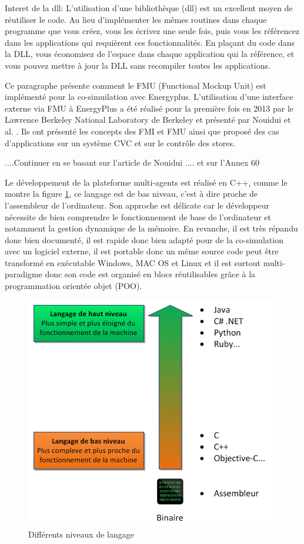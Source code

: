 Interet de la dll: L'utilisation d'une bibliothèque (dll) est un excellent moyen de réutiliser le code. Au lieu d'implémenter les mêmes routines dans chaque programme que vous créez, vous les écrivez une seule fois, puis vous les référencez dans les applications qui requièrent ces fonctionnalités. En plaçant du code dans la DLL, vous économisez de l'espace dans chaque application qui la référence, et vous pouvez mettre à jour la DLL sans recompiler toutes les applications.

Ce paragraphe présente comment le FMU (Functional Mockup Unit) est implémenté pour la co-simuilation avec Energyplus. L'utilisation d'une interface externe via FMU à EnergyPlus a été réalisé pour la première fois en 2013 par le Lawrence Berkeley National Laboratory de Berkeley et présenté par Nouidui et al. \cite{Nouidui-13}. Ils ont présenté les concepts des FMI et FMU ainsi que proposé des cas d'applications sur un système CVC et sur le contrôle des stores.

....Continuer en se basant sur l'article de Nouidui \cite{Nouidui-13}.... et sur l'Annex 60

Le développement de la plateforme multi-agents est réalisé en C++, comme le montre la figure \ref{fig:CPP}, ce langage est de bas niveau, c'est à dire proche de l'assembleur de l'ordinateur. Son approche est délicate car le développeur nécessite de bien comprendre le fonctionnement de base de l'ordinateur et notamment la gestion dynamique de la mémoire. En revanche, il est très répandu donc bien documenté, il est rapide donc bien adapté pour de la co-simulation avec un logiciel externe, il est portable donc un même source code peut être transformé en exécutable Windows, MAC OS et Linux et il est surtout multi-paradigme donc son code est organisé en blocs réutilisables grâce à la programmation orientée objet (POO).

\begin{figure}[H]
\centering
\includegraphics[scale=0.8]{Images/CPP}
\caption{Différents niveaux de langage}
\label{fig:CPP}
\end{figure}

